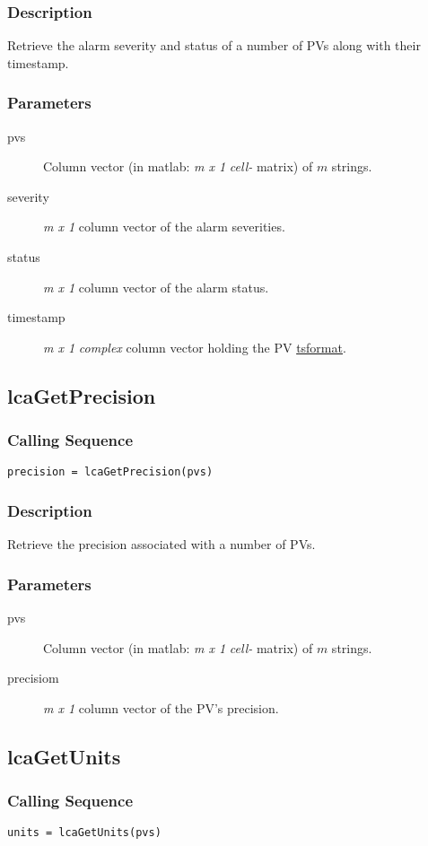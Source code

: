 \documentclass{article}
\newcommand{\pbrk}{\pagebreak[3]}
\newcommand{\ita}[1]{\emph{#1}}
\newcommand{\m}{$m$}
\newcommand{\mhack}{$m$} %
\newcommand{\mxl}{$m\times 1$}
\renewcommand{\m}{\ita{m}}
\newcommand{\mhack}{\ita{m}} %
\renewcommand{\mxl}{\ita{m x 1}}
\renewcommand{\pbrk}{}
\newcommand{\PVITEM}{
\item[pvs] Column vector (in matlab: \mxl{} \ita{cell-} matrix)
of \mhack{} strings.
}
\begin{document}
\subsubsection{Description}
Retrieve the alarm severity and status of a number of PVs along
with their timestamp.
\subsubsection{Parameters}
\begin{description}
\PVITEM
\item[severity] \mxl{} column vector of the alarm severities.
\item[status] \mxl{} column vector of the alarm status.
\item[timestamp] \mxl{} \ita{complex} column vector holding the
PV \hyperref{timestamps}{timestamps (see }{ about the timestamp format)}{tsformat}.
\end{description}


\vspace*{\fill}
\pbrk
\subsection{lcaGetPrecision}
\subsubsection{Calling Sequence}
\begin{verbatim}
precision = lcaGetPrecision(pvs)
\end{verbatim}
\subsubsection{Description}
Retrieve the precision associated with a number of PVs.
\subsubsection{Parameters}
\begin{description}
\PVITEM
\item[precisiom] \mxl{} column vector of the PV's precision.
\end{description}

\vspace*{\fill}
\pbrk
\subsection{lcaGetUnits}
\subsubsection{Calling Sequence}
\begin{verbatim}
units = lcaGetUnits(pvs)
\end{verbatim}
\end{document}
